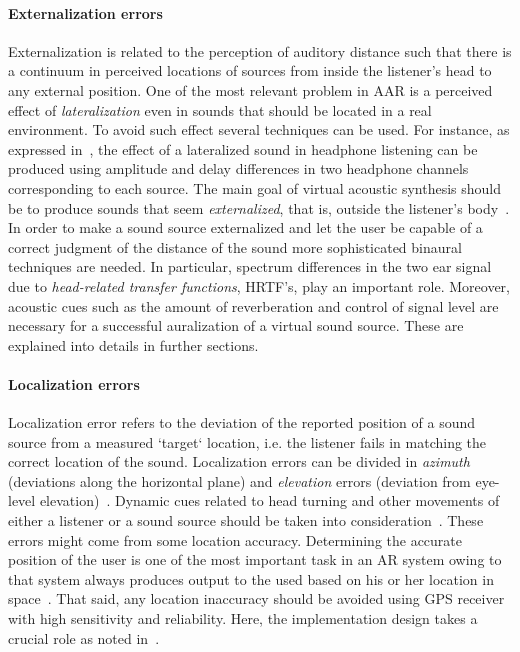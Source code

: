 \documentclass[journal]{IEEEtran}
\begin{document}
\paragraph{Externalization errors}
Externalization is related to the perception of auditory distance such that there is a continuum in perceived locations of sources from inside the listener's head to any external position. One of the most relevant problem in AAR is a perceived effect of \emph{lateralization} even in sounds that should be located in a real environment. To avoid such effect several techniques can be used. For instance, as expressed in~\cite{}, the effect of a lateralized sound in headphone listening can be produced using amplitude and delay differences in two headphone channels corresponding to each source. The main goal of virtual acoustic synthesis should be to produce sounds that seem \emph{externalized}, that is, outside the listener's body~\cite{}. In order to make a sound source externalized and let the user be capable of a correct judgment of the distance of the sound more sophisticated binaural techniques are needed. In particular, spectrum differences in the two ear signal due to \emph{head-related transfer functions}, HRTF's, play an important role. Moreover, acoustic cues such as the amount of reverberation and control of signal level are necessary for a successful auralization of a virtual sound source. These are explained into details in further sections.
\paragraph{Localization errors}
Localization error refers to the deviation of the reported position of a sound source from a measured `target` location, i.e. the listener fails in matching the correct location of the sound. Localization errors can be divided in \emph{azimuth} (deviations along the horizontal plane) and \emph{elevation} errors (deviation from eye-level elevation)~\cite{}. Dynamic cues related to head turning and other movements of either a listener or a sound source should be taken into consideration~\cite{}. These errors might come from some location accuracy. Determining the accurate position of the user is one of the most important task in an AR system owing to that system always produces output to the used based on his or her location in space~\cite{}. That said, any location inaccuracy should be avoided using GPS receiver with high sensitivity and reliability. Here, the implementation design takes a crucial role as noted in~\cite{}.
\end{document}
